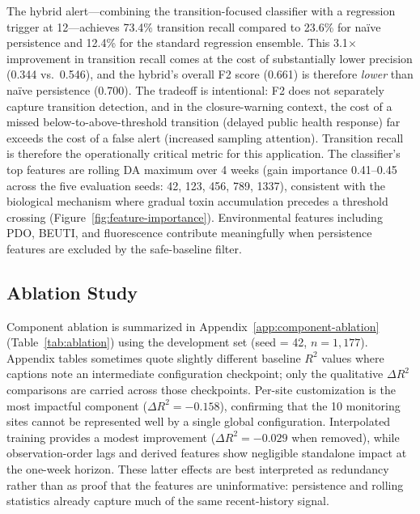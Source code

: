 \documentclass[toxins,article,submit,moreauthors]{Definitions/mdpi}
\begin{document}
The hybrid alert---combining the transition-focused classifier with a regression trigger at \SI{12}{\microgrampeg}---achieves 73.4\% transition recall compared to 23.6\% for na\"ive persistence and 12.4\% for the standard regression ensemble. This 3.1$\times$ improvement in transition recall comes at the cost of substantially lower precision (0.344 vs.\ 0.546), and the hybrid's overall F2 score (0.661) is therefore \textit{lower} than na\"ive persistence (0.700). The tradeoff is intentional: F2 does not separately capture transition detection, and in the closure-warning context, the cost of a missed below-to-above-threshold transition (delayed public health response) far exceeds the cost of a false alert (increased sampling attention). Transition recall is therefore the operationally critical metric for this application. The classifier's top features are rolling DA maximum over 4 weeks (gain importance 0.41--0.45 across the five evaluation seeds: 42, 123, 456, 789, 1337), consistent with the biological mechanism where gradual toxin accumulation precedes a threshold crossing (Figure~\ref{fig:feature-importance}). Environmental features including PDO, BEUTI, and fluorescence contribute meaningfully when persistence features are excluded by the safe-baseline filter.

\subsection{Ablation Study}
\label{sec:results-ablation}

Component ablation is summarized in Appendix~\ref{app:component-ablation} (Table~\ref{tab:ablation}) using the development set (seed = 42, $n = 1{,}177$). Appendix tables sometimes quote slightly different baseline $R^2$ values where captions note an intermediate configuration checkpoint; only the qualitative $\Delta R^2$ comparisons are carried across those checkpoints. Per-site customization is the most impactful component ($\Delta R^2 = -0.158$), confirming that the 10 monitoring sites cannot be represented well by a single global configuration. Interpolated training provides a modest improvement ($\Delta R^2 = -0.029$ when removed), while observation-order lags and derived features show negligible standalone impact at the one-week horizon. These latter effects are best interpreted as redundancy rather than as proof that the features are uninformative: persistence and rolling statistics already capture much of the same recent-history signal.
\end{document}
